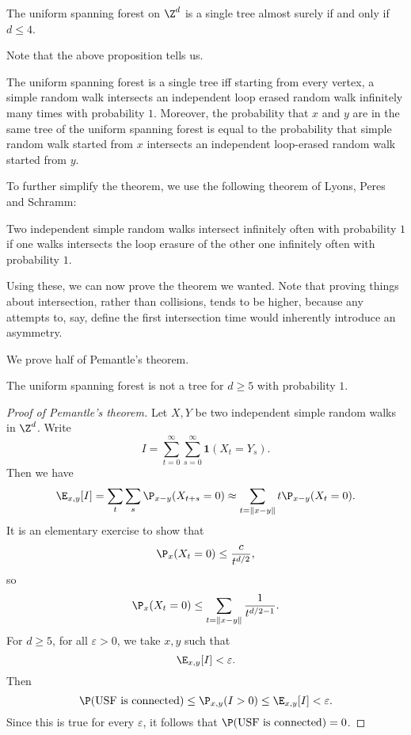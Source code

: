 \documentclass[a4paper]{article}
\begin{document}
\begin{thm}[Pemantle, 1991]
  The uniform spanning forest on $\Z^d$ is a single tree almost surely if and only if $d \leq 4$.
\end{thm}

Note that the above proposition tells us.
\begin{prop}[Pemantle]
  The uniform spanning forest is a single tree iff starting from every vertex, a simple random walk intersects an independent loop erased random walk infinitely many times with probability $1$. Moreover, the probability that $x$ and $y$ are in the same tree of the uniform spanning forest is equal to the probability that simple random walk started from $x$ intersects an independent loop-erased random walk started from $y$.
\end{prop}

To further simplify the theorem, we use the following theorem of Lyons, Peres and Schramm:
\begin{thm}
  Two independent simple random walks intersect infinitely often with probability $1$ if one walks intersects the loop erasure of the other one infinitely often with probability $1$.
\end{thm}

Using these, we can now prove the theorem we wanted. Note that proving things about intersection, rather than collisions, tends to be higher, because any attempts to, say, define the first intersection time would inherently introduce an asymmetry.

We prove half of Pemantle's theorem.
\begin{thm}
  The uniform spanning forest is not a tree for $d \geq 5$ with probability $1$.
\end{thm}

\begin{proof}[Proof of Pemantle's theorem]
  Let $X, Y$ be two independent simple random walks in $\Z^d$. Write
  \[
    I = \sum_{t = 0}^\infty \sum_{s = 0}^\infty \mathbf{1}(X_t = Y_s).
  \]
  Then we have
  \[
    \E_{x, y}[I] = \sum_t \sum_s \P_{x - y} (X_{t + s} = 0) \approx \sum_{t = \|x - y\|} t \P_{x - y}(X_t = 0).
  \]
  It is an elementary exercise to show that
  \[
    \P_x(X_t = 0) \leq \frac{c}{t^{d/2}},
  \]
  so
  \[
    \P_x(X_t = 0) \leq \sum_{t = \|x - y\|} \frac{1}{t^{d/2 - 1}}.
  \]
  For $d \geq 5$, for all $\varepsilon > 0$, we take $x, y$ such that
  \[
    \E_{x, y} [I] < \varepsilon.
  \]
  Then
  \[
    \P(\text{USF is connected}) \leq \P_{x, y}(I > 0) \leq \E_{x, y}[I] < \varepsilon.
  \]
  Since this is true for every $\varepsilon$, it follows that $\P(\text{USF is connected}) = 0$.
\end{proof}

\printindex
\end{document}
